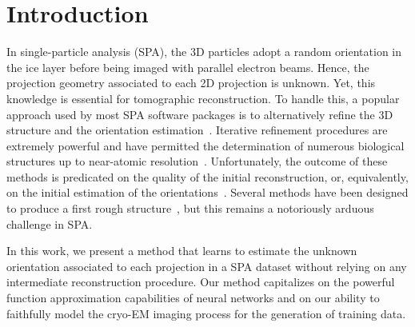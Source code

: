 \section{Introduction}


In single-particle analysis (SPA), the 3D particles adopt a random orientation in the ice layer before being imaged with parallel electron beams.
Hence, the projection geometry associated to each 2D projection is unknown.
Yet, this knowledge is essential for tomographic reconstruction.
To handle this, a popular approach used by most SPA software packages is to alternatively refine the 3D structure and the orientation estimation~\cite{penczek1994ribosome,Baker1996,Dempster1977,sigworth1998maximum,scheres2012bayesian}.
Iterative refinement procedures are extremely powerful and have permitted the determination of numerous biological structures up to near-atomic resolution~\cite{kuhlbrandt2014resolution}.
Unfortunately, the outcome of these methods is predicated on the quality of the initial reconstruction, or, equivalently, on the initial estimation of the orientations~\cite{sorzano2006optimization,henderson2012outcome}.
Several methods have been designed to produce a first rough structure~\cite{singer2010detecting,wang2013orientation,greenberg2017common,punjani2017cryosparc,pragier2019common}, but this remains a notoriously arduous challenge in SPA.

In this work, we present a method that learns to estimate the unknown orientation associated to each projection in a SPA dataset without relying on any intermediate reconstruction procedure.
Our method capitalizes on the powerful function approximation capabilities of neural networks and on our ability to faithfully model the cryo-EM imaging process for the generation of training data.
